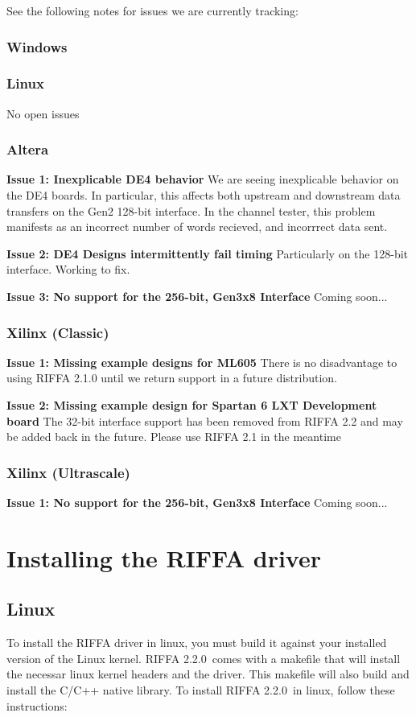 \documentclass{refrep}
\newcommand{\RIFFAVer}{2.2.0}
\begin{document}
See the following notes for issues we are currently tracking:

\subsection{Windows}
\subsection{Linux}
No open issues
\subsection{Altera}
\textbf{Issue 1: Inexplicable DE4 behavior} We are seeing inexplicable behavior
on the DE4 boards. In particular, this affects both upstream and downstream data
transfers on the Gen2 128-bit interface. In the channel tester, this problem
manifests as an incorrect number of words recieved, and incorrrect data sent.

\textbf{Issue 2: DE4 Designs intermittently fail timing} Particularly on the
128-bit interface. Working to fix.

\textbf{Issue 3: No support for the 256-bit, Gen3x8 Interface} Coming soon...
\subsection{Xilinx (Classic)}

\textbf{Issue 1: Missing example designs for ML605} There is no disadvantage to
using RIFFA 2.1.0 until we return support in a future distribution.

\textbf{Issue 2: Missing example design for Spartan 6 LXT Development board} The
32-bit interface support has been removed from RIFFA 2.2 and may be added back
in the future. Please use RIFFA 2.1 in the meantime

\subsection{Xilinx (Ultrascale)}
\textbf{Issue 1: No support for the 256-bit, Gen3x8 Interface} Coming soon...

\pagebreak

\chapter{Installing the RIFFA driver}
\label{Sec:RIFFA:Installation}
\section{Linux}
To install the RIFFA driver in linux, you must build it against your installed
version of the Linux kernel. RIFFA \RIFFAVer~comes with a makefile that will
install the necessar linux kernel headers and the driver. This makefile will
also build and install the C/C++ native library. To install RIFFA \RIFFAVer~in
linux, follow these instructions:
\end{document}
